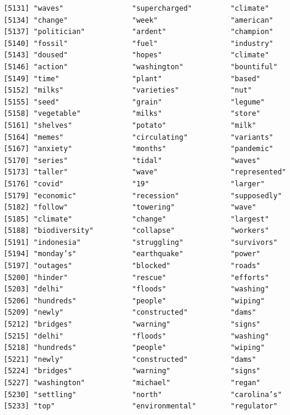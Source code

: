\documentclass[
  letterpaper,
  DIV=11,
  numbers=noendperiod]{scrartcl}
\begin{document}
\begin{verbatim}
[5131] "waves"                "supercharged"         "climate"             
[5134] "change"               "week"                 "american"            
[5137] "politician"           "ardent"               "champion"            
[5140] "fossil"               "fuel"                 "industry"            
[5143] "doused"               "hopes"                "climate"             
[5146] "action"               "washington"           "bountiful"           
[5149] "time"                 "plant"                "based"               
[5152] "milks"                "varieties"            "nut"                 
[5155] "seed"                 "grain"                "legume"              
[5158] "vegetable"            "milks"                "store"               
[5161] "shelves"              "potato"               "milk"                
[5164] "memes"                "circulating"          "variants"            
[5167] "anxiety"              "months"               "pandemic"            
[5170] "series"               "tidal"                "waves"               
[5173] "taller"               "wave"                 "represented"         
[5176] "covid"                "19"                   "larger"              
[5179] "economic"             "recession"            "supposedly"          
[5182] "follow"               "towering"             "wave"                
[5185] "climate"              "change"               "largest"             
[5188] "biodiversity"         "collapse"             "workers"             
[5191] "indonesia"            "struggling"           "survivors"           
[5194] "monday’s"             "earthquake"           "power"               
[5197] "outages"              "blocked"              "roads"               
[5200] "hinder"               "rescue"               "efforts"             
[5203] "delhi"                "floods"               "washing"             
[5206] "hundreds"             "people"               "wiping"              
[5209] "newly"                "constructed"          "dams"                
[5212] "bridges"              "warning"              "signs"               
[5215] "delhi"                "floods"               "washing"             
[5218] "hundreds"             "people"               "wiping"              
[5221] "newly"                "constructed"          "dams"                
[5224] "bridges"              "warning"              "signs"               
[5227] "washington"           "michael"              "regan"               
[5230] "settling"             "north"                "carolina’s"          
[5233] "top"                  "environmental"        "regulator"           

\end{verbatim}
\end{document}

